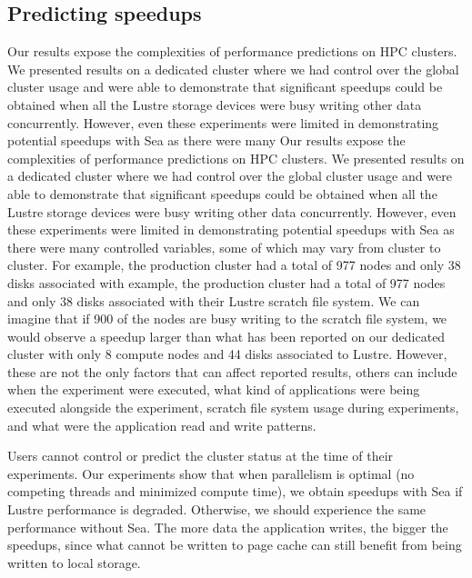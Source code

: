 \documentclass[fleqn,10pt]{wlscirep}
\begin{document}
    \subsection{Predicting speedups}

    Our results expose the complexities of performance predictions on HPC clusters. We presented results on a dedicated cluster
    where we had
    control over the global cluster usage and were able to demonstrate that
    significant speedups could be obtained when all the Lustre storage devices were
    busy writing other data concurrently. However, even these experiments were
    limited in demonstrating potential speedups with Sea as there were many
    Our results expose the complexities of performance predictions on HPC clusters. We presented results on a dedicated cluster
    where we had
    control over the global cluster usage and were able to demonstrate that
    significant speedups could be obtained when all the Lustre storage devices were
    busy writing other data concurrently. However, even these experiments were
    limited in demonstrating potential speedups with Sea as there were many
    controlled variables, some of which may vary from cluster to cluster. For
    example, the production cluster had a total of 977 nodes and only 38 disks associated with
    example, the production cluster had a total of 977 nodes and only 38 disks associated with
    their Lustre scratch file system. We can imagine that if 900 of the nodes
    are busy writing to the scratch file system, we would observe a speedup
    larger than what has been reported on our dedicated cluster with only 8 compute
    nodes and 44 disks associated to Lustre. However, these are not the only
    factors that can affect reported results, others can include when the
    experiment were executed, what kind of applications were being executed
    alongside the experiment, scratch file system usage during experiments, and
    what were the application read and write patterns.

    Users cannot control or predict the cluster status at the time of their
    experiments.
    Our experiments show that when parallelism is optimal (no competing threads
    and minimized compute time), we obtain speedups with Sea if Lustre
    performance is degraded. Otherwise, we should experience the same
    performance without Sea. The more data the application writes, the bigger
    the speedups, since what cannot be written to page cache can still benefit from
    being written to local storage.
    
\end{document}
